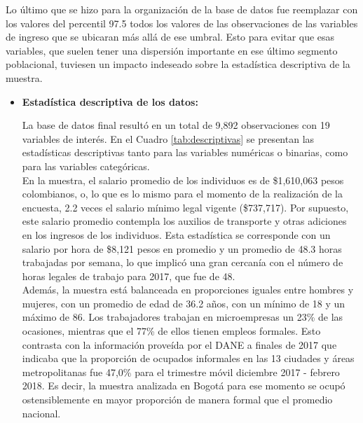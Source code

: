 \documentclass[12pt,a4paper,onecolumn]{article}
\begin{document}
\begin{itemize}
Lo último que se hizo para la organización de la base de datos fue reemplazar con los valores del percentil 97.5 todos los valores de las observaciones de las variables de ingreso que se ubicaran más allá de ese umbral. Esto para evitar que esas variables, que suelen tener una dispersión importante en ese último segmento poblacional, tuviesen un impacto indeseado sobre la estadística descriptiva de la muestra.\\   

\end{itemize}

\begin{itemize}
\item \textbf{Estadística descriptiva de los datos:}

La base de datos final resultó en un total de 9,892 observaciones con 19 variables de interés. En el Cuadro \ref{tab:descriptivas} se presentan las estadísticas descriptivas tanto para las variables numéricas o binarias, como para las variables categóricas.\\

En la muestra, el salario promedio de los individuos es de \$1,610,063 pesos colombianos, o, lo que es lo mismo para el momento de la realización de la encuesta, 2.2 veces el salario mínimo legal vigente (\$737,717). Por supuesto, este salario promedio contempla los auxilios de transporte y otras adiciones en los ingresos de los individuos. Esta estadística se corresponde con un salario por hora de \$8,121 pesos en promedio y un promedio de 48.3 horas trabajadas por semana, lo que implicó una gran cercanía con el número de horas legales de trabajo para 2017, que fue de 48.\\

Además, la muestra está balanceada en proporciones iguales entre hombres y mujeres, con un promedio de edad de 36.2 años, con un mínimo de 18 y un máximo de 86. Los trabajadores trabajan en microempresas un 23\% de las ocasiones, mientras que el 77\% de ellos tienen empleos formales. Esto contrasta con la información proveída por el DANE a finales de 2017 que indicaba que la proporción de ocupados informales en las 13 ciudades y áreas metropolitanas fue 47,0\% para el trimestre móvil diciembre 2017 - febrero 2018. Es decir, la muestra analizada en Bogotá para ese momento se ocupó ostensiblemente en mayor proporción de manera formal que el promedio nacional.\\


\end{itemize}
\end{document}
